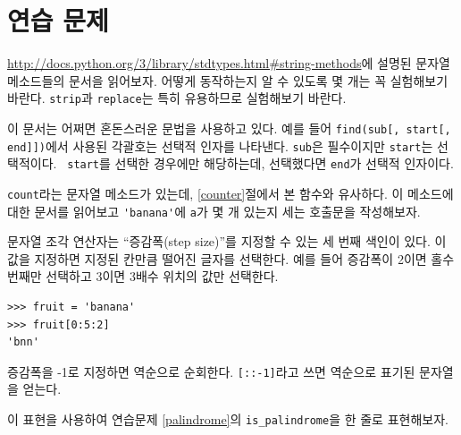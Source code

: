 \documentclass[10pt]{book}
\begin{document}
\section{연습 문제}

\begin{exercise}

\url{http://docs.python.org/3/library/stdtypes.html#string-methods}에
설명된 문자열 메소드들의 문서을 읽어보자.  어떻게 동작하는지 알 수
있도록 몇 개는 꼭 실험해보기 바란다.  {\tt strip}과 {\tt replace}는
특히 유용하므로 실험해보기 바란다.

이 문서는 어쩌면 혼돈스러운 문법을 사용하고 있다.  예를 들어
\verb"find(sub[, start[, end]])"에서 사용된 각괄호는 선택적 인자를
나타낸다.  {\tt sub}은 필수이지만 {\tt start}는 선택적이다.  {\tt
  start}를 선택한 경우에만 해당하는데, 선택했다면 {\tt end}가 선택적
인자이다.

\end{exercise}


\begin{exercise}

{\tt count}라는 문자열 메소드가 있는데, \ref{counter}절에서 본 함수와
유사하다.  이 메소드에 대한 문서를 읽어보고 \verb"'banana'"에 {\tt a}가
몇 개 있는지 세는 호출문을 작성해보자.
\end{exercise}


\begin{exercise}

문자열 조각 연산자는 ``증감폭(step size)''를 지정할 수 있는 세 번째
색인이 있다.  이 값을 지정하면 지정된 칸만큼 떨어진 글자를 선택한다.
예를 들어 증감폭이 2이면 홀수 번째만 선택하고 3이면 3배수 위치의 값만
선택한다.

\begin{verbatim}
>>> fruit = 'banana'
>>> fruit[0:5:2]
'bnn'
\end{verbatim}

증감폭을 -1로 지정하면 역순으로 순회한다.  \verb"[::-1]"라고 쓰면
역순으로 표기된 문자열을 얻는다.

이 표현을 사용하여 연습문제 \ref{palindrome}의 \verb"is_palindrome"을
한 줄로 표현해보자.
\end{exercise}
\end{document}
